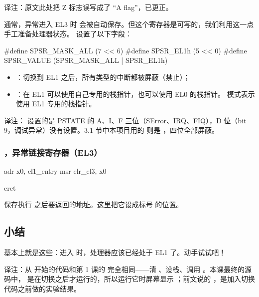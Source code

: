 \begin{remark}
  译注：原文此处把 Z 标志误写成了 “A flag”，已更正。
\end{remark}

通常，异常进入 EL3 时  会被自动保存。但这个寄存器是可写的，我们利用这一点手工准备处理器状态。 设置了以下字段：

\begin{ccode}
#define SPSR_MASK_ALL   (7 << 6)
#define SPSR_EL1h       (5 << 0)
#define SPSR_VALUE      (SPSR_MASK_ALL | SPSR_EL1h)
\end{ccode}

\begin{itemize}
  \item {}：切换到 EL1 之后，所有类型的中断都被屏蔽（禁止）；
  \item {}：在 EL1 可以使用自己专用的栈指针，也可以使用 EL0 的栈指针。 模式表示使用 EL1 专用的栈指针。
\end{itemize}

\begin{remark}
  译注： 设置的是 PSTATE 的 A、I、F 三位（SError、IRQ、FIQ），D 位（bit 9，调试异常）没有设置。3.1 节中本项目用的  则是 ，四位全部屏蔽。
\end{remark}

\subsubsection{，异常链接寄存器（EL3）}

\begin{asmcode}
	adr	x0, el1_entry
	msr	elr_el3, x0

	eret
\end{asmcode}

 保存执行  之后要返回的地址。这里把它设成标号  的位置。

\subsection{小结}

基本上就是这些：进入  时，处理器应该已经处于 EL1 了。动手试试吧！

\begin{remark}
  译注：从  开始的代码和第 1 课的  完全相同——清 、设栈、调用 。本课最终的源码中， 是在切换之后才运行的，所以运行它时屏幕显示 ；前文说的 ，是加入切换代码之前做的实验结果。
\end{remark}
